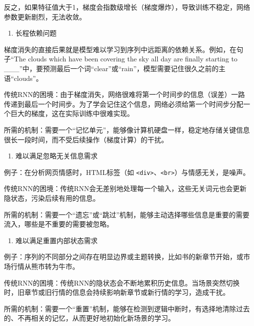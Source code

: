 反之，如果特征值大于1，梯度会指数级增长（梯度爆炸），导致训练不稳定，网络参数更新剧烈，无法收敛。

\begin{enumerate}
\def\labelenumi{\arabic{enumi}.}
\setcounter{enumi}{1}
\tightlist
\item
  长程依赖问题
\end{enumerate}

梯度消失的直接后果就是模型难以学习到序列中远距离的依赖关系。例如，在句子``The clouds which have been covering the sky all day are finally starting to \_\_\_''中，要预测最后一个词``clear''或``rain''，模型需要记住很久之前的主语``clouds''。

传统RNN的困境：由于梯度消失，网络很难将第一个时间步的信息（误差）一路传递到最后一个时间步。为了学会记住这个信息，网络必须给第一个时间步分配一个巨大的梯度，这在实际训练中很难实现。

所需的机制：需要一个``记忆单元''，能够像计算机硬盘一样，稳定地存储关键信息很长一段时间，而不受后续操作（梯度计算）的干扰。

\begin{enumerate}
\def\labelenumi{\arabic{enumi}.}
\setcounter{enumi}{2}
\tightlist
\item
  难以满足忽略无关信息需求
\end{enumerate}

例子：在分析网页情感时，HTML标签（如 \texttt{\textless{}div\textgreater{}}、\texttt{\textless{}br\textgreater{}}）与情感无关，是噪声。

传统RNN的困境：传统RNN会无差别地处理每一个输入，这些无关词元也会更新隐状态，污染后续有用的信息。

所需的机制：需要一个``遗忘''或``跳过''机制，能够主动选择哪些信息是重要的需要流入，哪些是不重要的需要被忽略。

\begin{enumerate}
\def\labelenumi{\arabic{enumi}.}
\setcounter{enumi}{3}
\tightlist
\item
  难以满足重置内部状态需求
\end{enumerate}

例子：序列的不同部分之间存在明显边界或主题转换，比如书的新章节开始，或市场行情从熊市转为牛市。

传统RNN的困境：传统RNN的隐状态会不断地累积历史信息。当场景突然切换时，旧章节或旧行情的信息会持续影响新章节或新行情的学习，造成干扰。

所需的机制：需要一个``重置''机制，能够在检测到逻辑中断时，有选择地清除过去的、不再相关的记忆，从而更好地初始化新场景的学习。

